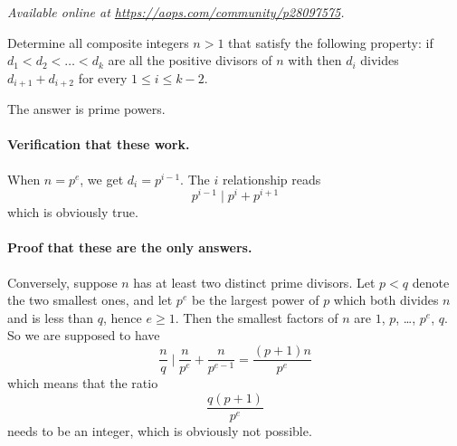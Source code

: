 \textsl{Available online at \url{https://aops.com/community/p28097575}.}
\begin{mdframed}[style=mdpurplebox,frametitle={Problem statement}]
Determine all composite integers $n>1$ that satisfy the following property:
if $d_1 < d_2 < \dots < d_k$ are all the positive divisors of $n$ with
then $d_i$ divides $d_{i+1} + d_{i+2}$ for every $1 \leq i \leq k - 2$.
\end{mdframed}
The answer is prime powers.

\paragraph{Verification that these work.}
When $n = p^e$, we get $d_i = p^{i-1}$.
The $i$ relationship reads \[ p^{i-1} \mid p^i + p^{i+1} \]
which is obviously true.

\paragraph{Proof that these are the only answers.}
Conversely, suppose $n$ has at least two distinct prime divisors.
Let $p < q$ denote the two smallest ones,
and let $p^e$ be the largest power of $p$ which both divides $n$
and is less than $q$, hence $e \ge 1$.
Then the smallest factors of $n$ are $1$, $p$, \dots, $p^e$, $q$.
So we are supposed to have
\[ \frac{n}{q} \mid \frac{n}{p^e} + \frac{n}{p^{e-1}}
    = \frac{(p+1)n}{p^e} \]
which means that the ratio
\[ \frac{q(p+1)}{p^e} \]
needs to be an integer, which is obviously not possible.
\pagebreak